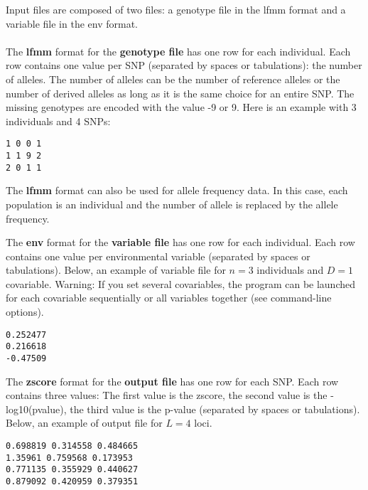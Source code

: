 \documentclass[10pt,a4paper]{article}
\begin{document}
Input files are composed of two files: a genotype file in the lfmm format and a variable file in the env format. 
\\
\\
The {\bf lfmm} format for the {\bf genotype file} has one row for each individual. Each row contains
one value per SNP (separated by spaces or tabulations): the number of alleles.
The number of alleles can be the number of reference alleles or the number
of derived alleles as long as it is the same choice for an entire SNP. The missing
genotypes are encoded with the value -9 or 9.
Here is an example with 3 individuals and 4 SNPs:
\begin{center}
\begin{Verbatim}[frame=single]
1 0 0 1
1 1 9 2
2 0 1 1
\end{Verbatim}
\end{center}
The {\bf lfmm} format can also be used for allele frequency data. In this case, each population is an individual
and the number of allele is replaced by the allele frequency.

\noindent
The {\bf env} format for the {\bf variable file} has one row for each individual. 
Each row contains one value per environmental variable
(separated by spaces or tabulations).
Below, an example of variable file for $n=3$ individuals and $D=1$ covariable.
Warning: If you set several covariables, the program can be launched for each covariable sequentially
or all variables together (see command-line options).

\begin{center}
\begin{Verbatim}[frame=single]
0.252477
0.216618
-0.47509
\end{Verbatim}
\end{center}

\noindent
The {\bf zscore} format for the {\bf output file}
has one row for each SNP. Each row contains three values: The first value is the zscore, the second value is the -log10(pvalue), the third value is the p-value (separated by spaces or tabulations).
Below, an example of output file for $L=4$ loci.

\begin{center}
\begin{Verbatim}[frame=single]
0.698819 0.314558 0.484665
1.35961 0.759568 0.173953
0.771135 0.355929 0.440627 
0.879092 0.420959 0.379351
\end{Verbatim}
\end{center}
\end{document}
